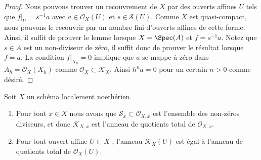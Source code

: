 \begin{proof}
Nous pouvons trouver un recouvrement de  $X$  par des ouverts affines
 $U$  tels que  $f|_U = s^{-1}a$  avec  $a \in \mathcal{O}_X(U)$  et  $s \in \mathcal{S}(U)$. Comme
 $X$  est quasi-compact, nous pouvons le recouvrir par un nombre fini
d'ouverts affines de cette forme. Ainsi, il suffit de prouver le lemme lorsque
 $X = \Spec(A)$  et  $f = s^{-1}a$. Notez que  $s \in A$  est un non-diviseur de zéro,
il suffit donc de prouver le résultat lorsque  $f = a$. La condition
 $f|_{X_h} = 0$  implique que  $a$  se mappe à zéro dans  $A_h = \mathcal{O}_X(X_h)$  comme
 $\mathcal{O}_X \subset \mathcal{K}_X$. Ainsi  $h^na = 0$  pour un certain  $n > 0$  comme désiré.
\end{proof}

\begin{lemma}
\label{lemma-locally-Noetherian-K}
Soit  $X$  un schéma localement noethérien.
\begin{enumerate}
\item Pour tout  $x \in X$  nous avons que  $\mathcal{S}_x \subset \mathcal{O}_{X, x}$  est l'ensemble des non-zéros
diviseurs, et donc  $\mathcal{K}_{X, x}$  est l'anneau de quotients total de  $\mathcal{O}_{X, x}$.
\item Pour tout ouvert affine  $U \subset X$ , l'anneau  $\mathcal{K}_X(U)$  est égal à l'anneau de
quotients total de  $\mathcal{O}_X(U)$.
\end{enumerate}
\end{lemma}

